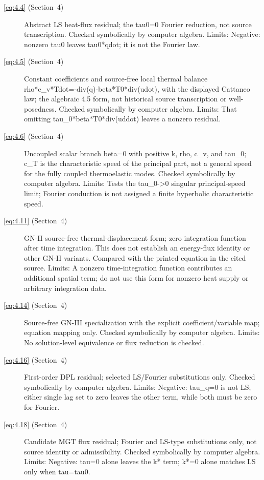 \begin{description}
  \item[\eqref{eq:4.4} (Section~4)] Abstract LS heat-flux residual; the tau0=0 Fourier reduction, not source transcription. Checked symbolically by computer algebra. Limits: Negative: nonzero tau0 leaves tau0*qdot; it is not the Fourier law.

  \item[\eqref{eq:4.5} (Section~4)] Constant coefficients and source-free local thermal balance rho*c_v*Tdot=-div(q)-beta*T0*div(udot), with the displayed Cattaneo law; the algebraic 4.5 form, not historical source transcription or well-posedness. Checked symbolically by computer algebra. Limits: That omitting tau_0*beta*T0*div(uddot) leaves a nonzero residual.

  \item[\eqref{eq:4.6} (Section~4)] Uncoupled scalar branch beta=0 with positive k, rho, c_v, and tau_0; c_T is the characteristic speed of the principal part, not a general speed for the fully coupled thermoelastic modes. Checked symbolically by computer algebra. Limits: Tests the tau_0->0 singular principal-speed limit; Fourier conduction is not assigned a finite hyperbolic characteristic speed.

  \item[\eqref{eq:4.11} (Section~4)] GN-II source-free thermal-displacement form; zero integration function after time integration. This does not establish an energy-flux identity or other GN-II variants. Compared with the printed equation in the cited source. Limits: A nonzero time-integration function contributes an additional spatial term; do not use this form for nonzero heat supply or arbitrary integration data.

  \item[\eqref{eq:4.14} (Section~4)] Source-free GN-III specialization with the explicit coefficient/variable map; equation mapping only. Checked symbolically by computer algebra. Limits: No solution-level equivalence or flux reduction is checked.

  \item[\eqref{eq:4.16} (Section~4)] First-order DPL residual; selected LS/Fourier substitutions only. Checked symbolically by computer algebra. Limits: Negative: tau_q=0 is not LS; either single lag set to zero leaves the other term, while both must be zero for Fourier.

  \item[\eqref{eq:4.18} (Section~4)] Candidate MGT flux residual; Fourier and LS-type substitutions only, not source identity or admissibility. Checked symbolically by computer algebra. Limits: Negative: tau=0 alone leaves the k* term; k*=0 alone matches LS only when tau=tau0.


\end{description}
